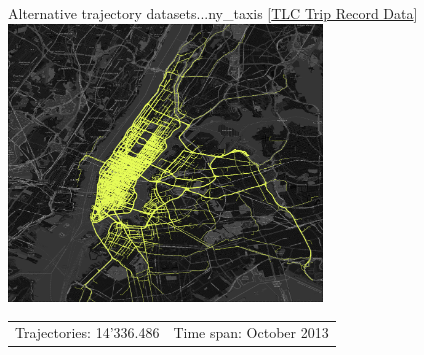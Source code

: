 \documentclass{beamer}
\begin{document}
\begin{frame}{Alternative trajectory datasets...}{ny\_taxis [\href{https://chriswhong.com/open-data/foil_nyc_taxi/}{TLC Trip Record Data}]}
    \centering
    \includegraphics[width=0.625\textwidth]{figures/ny_taxis}
    \begin{tabular}{r r}
            \small Trajectories: 14'336.486 & \small Time span: October 2013
    \end{tabular}
\end{frame}
\end{document}
